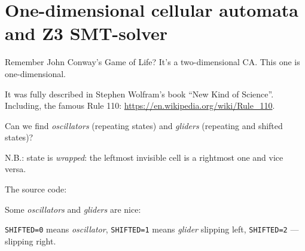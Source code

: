 \section{One-dimensional cellular automata and Z3 SMT-solver}

Remember John Conway's Game of Life? It's a two-dimensional CA.
This one is one-dimensional.

It was fully described in Stephen Wolfram's book ``New Kind of Science''.
Including, the famous Rule 110: \url{https://en.wikipedia.org/wiki/Rule_110}.

Can we find \textit{oscillators} (repeating states) and \textit{gliders} (repeating and shifted states)?

N.B.: state is \textit{wrapped}: the leftmost invisible cell is a rightmost one and vice versa.

The source code: 



Some \textit{oscillators} and \textit{gliders} are nice: 



\verb|SHIFTED=0| means \textit{oscillator}, \verb|SHIFTED=1| means \textit{glider} slipping left,
\verb|SHIFTED=2| --- slipping right.

